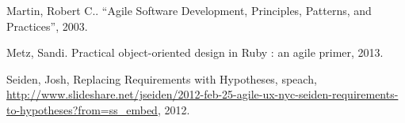 \documentclass[12pt]{report}
\begin{document}
%
%
\begin{thebibliography}{00}
%
Martin, Robert C.. ``Agile Software Development, Principles, Patterns,
and Practices'', 2003.

Metz, Sandi. Practical object-oriented design in Ruby : an agile primer, 2013.

Seiden, Josh, Replacing Requirements with Hypotheses, speach,
\url{http://www.slideshare.net/jseiden/2012-feb-25-agile-ux-nyc-seiden-requirements-to-hypotheses?from=ss_embed}, 2012.

\end{thebibliography}
% 
\end{document}
